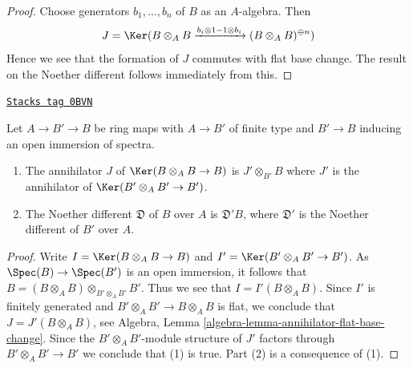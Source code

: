 \begin{proof}
Choose generators $b_1, \ldots, b_n$ of $B$ as an $A$-algebra.
Then
$$
J = \Ker(B \otimes_A B \xrightarrow{b_i \otimes 1 - 1 \otimes b_i}
(B \otimes_A B)^{\oplus n})
$$
Hence we see that the formation of $J$ commutes with flat base change.
The result on the Noether different follows immediately from this.
\end{proof}

\begin{lemma}
\label{discriminant-lemma-noether-different-localization}
\href{https://stacks.math.columbia.edu/tag/0BVN}{\texttt{Stacks tag 0BVN}}

Let $A \to B' \to B$ be ring maps with $A \to B'$
of finite type and $B' \to B$ inducing an open immersion of spectra.
\begin{enumerate}
\item The annihilator $J$ of $\Ker(B \otimes_A B \to B)$ is
$J' \otimes_{B'} B$ where $J'$ is the annihilator of
$\Ker(B' \otimes_A B' \to B')$.
\item The Noether different $\mathfrak{D}$ of $B$ over $A$ is
$\mathfrak{D}'B$, where $\mathfrak{D}'$ is
the Noether different of $B'$ over $A$.
\end{enumerate}
\end{lemma}

\begin{proof}
Write $I = \Ker(B \otimes_A B \to B)$ and $I' = \Ker(B' \otimes_A B' \to B')$.
As $\Spec(B) \to \Spec(B')$ is an open immersion, it follows that
$B = (B \otimes_A B) \otimes_{B' \otimes_A B'} B'$. Thus we see that
$I = I'(B \otimes_A B)$. Since $I'$ is finitely generated and
$B' \otimes_A B' \to B \otimes_A B$ is flat, we conclude that
$J = J'(B \otimes_A B)$, see
Algebra, Lemma \ref{algebra-lemma-annihilator-flat-base-change}.
Since the $B' \otimes_A B'$-module structure of $J'$
factors through $B' \otimes_A B' \to B'$ we conclude that (1) is true.
Part (2) is a consequence of (1).
\end{proof}

